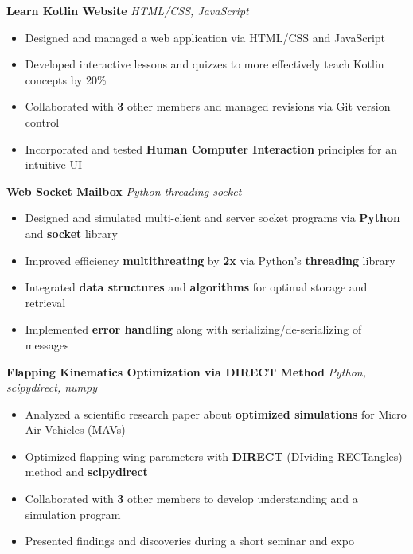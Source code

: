 \documentclass[11pt]{article}
\begin{document}
\textbf{Learn Kotlin Website {\textbar}}
\textit{
    {
    HTML/CSS, 
    JavaScript}
}
\begin{itemize}[itemsep=0pt, topsep=0pt]
    \item Designed and managed a web application via HTML/CSS and JavaScript
    \item Developed interactive lessons and quizzes to more effectively teach  Kotlin concepts by 20\%
    \item Collaborated with \textbf{3} other members and managed revisions via Git version control
    \item Incorporated and tested \textbf{Human Computer Interaction} principles for an intuitive UI
\end{itemize}

\textbf{Web Socket Mailbox {\textbar}}
\textit{
    Python
    threading
    socket
}
\begin{itemize}[itemsep=0pt, topsep=0pt]
    \item Designed and simulated multi-client and server socket programs via \textbf{Python} and \textbf{socket} library
    \item Improved efficiency \textbf{multithreating} by \textbf{2x} via Python's \textbf{threading} library
    \item Integrated \textbf{data structures} and \textbf{algorithms} for optimal storage and retrieval
    \item Implemented \textbf{error handling} along with serializing/de-serializing of messages
\end{itemize}



\textbf{Flapping Kinematics Optimization via DIRECT Method {\textbar}}
\textit{
    {
    Python,
    scipydirect, 
    numpy}
}
\begin{itemize}[itemsep=0pt, topsep=0pt]
    \item Analyzed a scientific research paper about \textbf{optimized simulations} for Micro Air Vehicles (MAVs)
    \item Optimized flapping wing parameters with \textbf{DIRECT} (DIviding RECTangles) method and \textbf{scipydirect}
    \item Collaborated with \textbf{3} other members to develop understanding and a simulation program
    \item Presented findings and discoveries during a short seminar and expo
\end{itemize}
\end{document}
